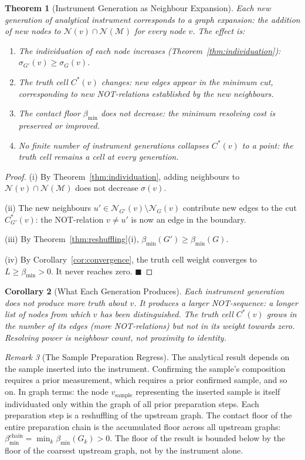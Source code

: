 \documentclass[12pt, a4paper]{article}
\theoremstyle{plain}
\newtheorem{theorem}{Theorem}[section]
\newtheorem{corollary}[theorem]{Corollary}
\theoremstyle{definition}
\theoremstyle{remark}
\newtheorem{remark}[theorem]{Remark}
\newcommand{\med}{\mathcal{M}}
\newcommand{\Nbd}{\mathcal{N}}
\newcommand{\bmin}{\beta_{\min}}
\newcommand{\qed}{\hfill$\blacksquare$}
\begin{document}
\begin{theorem}[Instrument Generation as Neighbour Expansion]
\label{thm:instrument_generation}
Each new generation of analytical instrument corresponds to a graph expansion:
the addition of new nodes to $\Nbd(v) \cap \Nbd(\med)$ for every node $v$.
The effect is:
\begin{enumerate}[label=(\roman*)]
  \item The individuation of each node increases (Theorem~\ref{thm:individuation}):
  $\sigma_{G'}(v) \geq \sigma_G(v)$.
  \item The truth cell $C^*(v)$ changes: new edges appear in the minimum
  cut, corresponding to new NOT-relations established by the new neighbours.
  \item The contact floor $\bmin$ does not decrease: the minimum resolving
  cost is preserved or improved.
  \item No finite number of instrument generations collapses $C^*(v)$ to a
  point: the truth cell remains a cell at every generation.
\end{enumerate}
\end{theorem}

\begin{proof}
(i) By Theorem~\ref{thm:individuation}, adding neighbours to $\Nbd(v) \cap
\Nbd(\med)$ does not decrease $\sigma(v)$.

(ii) The new neighbours $u' \in \Nbd_{G'}(v) \setminus \Nbd_G(v)$ contribute
new edges to the cut $C^*_{G'}(v)$: the NOT-relation $v \neq u'$ is now an
edge in the boundary.

(iii) By Theorem~\ref{thm:reshuffling}(i), $\bmin(G') \geq \bmin(G)$.

(iv) By Corollary~\ref{cor:convergence}, the truth cell weight converges to
$L \geq \bmin > 0$. It never reaches zero. \qed
\end{proof}

\begin{corollary}[What Each Generation Produces]
\label{cor:generation}
Each instrument generation does not produce more truth about $v$. It produces
a larger NOT-sequence: a longer list of nodes from which $v$ has been
distinguished. The truth cell $C^*(v)$ grows in the number of its edges
(more NOT-relations) but not in its weight towards zero. Resolving power is
neighbour count, not proximity to identity.
\end{corollary}

\begin{remark}[The Sample Preparation Regress]
\label{rem:regress}
The analytical result depends on the sample inserted into the instrument.
Confirming the sample's composition requires a prior measurement, which
requires a prior confirmed sample, and so on. In graph terms: the node
$v_{\mathrm{sample}}$ representing the inserted sample is itself individuated
only within the graph of all prior preparation steps. Each preparation step
is a reshuffling of the upstream graph. The contact floor of the entire
preparation chain is the accumulated floor across all upstream graphs:
$\bmin^{\mathrm{chain}} = \min_k \bmin(G_k) > 0$. The floor of the
result is bounded below by the floor of the coarsest upstream graph,
not by the instrument alone.
\end{remark}
\end{document}
